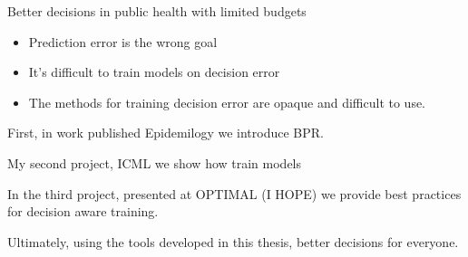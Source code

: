 Better decisions in public health with limited budgets

\begin{itemize}
    \item Prediction error is the wrong goal
    
    \item It's difficult to train models on decision error

    \item The methods for training decision error are opaque and difficult to use.
\end{itemize}

First, in work published Epidemilogy we introduce BPR.

My second project, ICML we show how train models

In the third project, presented at OPTIMAL (I HOPE) we provide best practices for decision aware training.

 Ultimately, using the tools developed in this thesis, better decisions for everyone. 